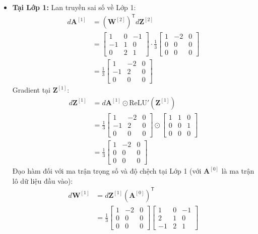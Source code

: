 \begin{itemize}
    \item \textbf{Tại Lớp 1:}
    Lan truyền sai số về Lớp 1:
    \begin{align*}
    d\mathbf{A}^{[1]} &= \left(\mathbf{W}^{[2]}\right)^{\mathsf{T}} d\mathbf{Z}^{[2]} \\
    &= \begin{bmatrix} 1 & 0 & -1 \\ -1 & 1 & 0 \\ 0 & 2 & 1 \end{bmatrix} \cdot \frac{1}{3}\begin{bmatrix} 1 & -2 & 0 \\ 0 & 0 & 0 \\ 0 & 0 & 0 \end{bmatrix} \\
    &= \frac{1}{3}\begin{bmatrix} 1 & -2 & 0 \\ -1 & 2 & 0 \\ 0 & 0 & 0 \end{bmatrix}
    \end{align*}
    Gradient tại $\mathbf{Z}^{[1]}$:
    \begin{align*}
    d\mathbf{Z}^{[1]} &= d\mathbf{A}^{[1]} \odot \text{ReLU}'\!\left(\mathbf{Z}^{[1]}\right) \\
    &= \frac{1}{3}\begin{bmatrix} 1 & -2 & 0 \\ -1 & 2 & 0 \\ 0 & 0 & 0 \end{bmatrix} \odot \begin{bmatrix} 1 & 1 & 0 \\ 0 & 0 & 1 \\ 0 & 0 & 0 \end{bmatrix} \\
    &= \frac{1}{3}\begin{bmatrix} 1 & -2 & 0 \\ 0 & 0 & 0 \\ 0 & 0 & 0 \end{bmatrix}
    \end{align*}
    Đạo hàm đối với ma trận trọng số và độ chệch tại Lớp 1 (với $\mathbf{A}^{[0]}$ là ma trận lô dữ liệu đầu vào):
    \begin{align*}
    d\mathbf{W}^{[1]} &= d\mathbf{Z}^{[1]}\left(\mathbf{A}^{[0]}\right)^{\mathsf{T}} \\
    &= \frac{1}{3}\begin{bmatrix} 1 & -2 & 0 \\ 0 & 0 & 0 \\ 0 & 0 & 0 \end{bmatrix}\begin{bmatrix} 1 & 0 & -1 \\ 2 & 1 & 0 \\ -1 & 2 & 1 \end{bmatrix} \\

\end{align*}
\end{itemize}
